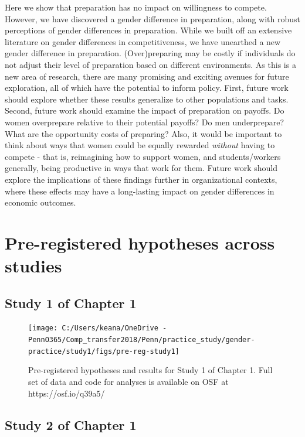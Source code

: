 \documentclass[a4paper, nobind]{templates/ociamthesis}
\begin{document}
Here we show that preparation has no impact on willingness to compete. However, we have discovered a gender difference in preparation, along with robust perceptions of gender differences in preparation. While we built off an extensive literature on gender differences in competitiveness, we have unearthed a new gender difference in preparation. (Over)preparing may be costly if individuals do not adjust their level of preparation based on different environments. As this is a new area of research, there are many promising and exciting avenues for future exploration, all of which have the potential to inform policy. First, future work should explore whether these results generalize to other populations and tasks. Second, future work should examine the impact of preparation on payoffs. Do women overprepare relative to their potential payoffs? Do men underprepare? What are the opportunity costs of preparing? Also, it would be important to think about ways that women could be equally rewarded \emph{without} having to compete - that is, reimagining how to support women, and students/workers generally, being productive in ways that work for them. Future work should explore the implications of these findings further in organizational contexts, where these effects may have a long-lasting impact on gender differences in economic outcomes.

\startappendices

\hypertarget{pre-registered-hypotheses-across-studies}{%
\chapter{Pre-registered hypotheses across studies}\label{pre-registered-hypotheses-across-studies}}

\hypertarget{study-1-of-chapter-1}{%
\section{Study 1 of Chapter 1}\label{study-1-of-chapter-1}}

\begin{figure}
\texttt{[image: C:/Users/keana/OneDrive - PennO365/Comp\_transfer2018/Penn/practice\_study/gender-practice/study1/figs/pre-reg-study1]} \caption{Pre-registered hypotheses and results for Study 1 of Chapter 1. Full set of data and code for analyses is available on OSF at https://osf.io/q39a5/}\label{fig:pre-reg-study1}
\end{figure}

\hypertarget{study-2-of-chapter-1}{%
\section{Study 2 of Chapter 1}\label{study-2-of-chapter-1}}
\end{document}
